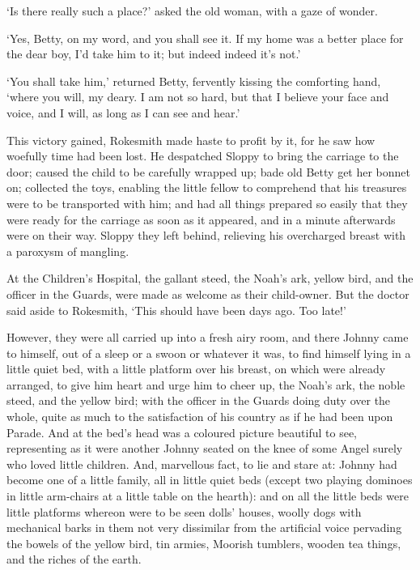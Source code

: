 ‘Is there really such a place?’ asked the old woman, with a gaze of
wonder.

‘Yes, Betty, on my word, and you shall see it. If my home was a better
place for the dear boy, I’d take him to it; but indeed indeed it’s not.’

‘You shall take him,’ returned Betty, fervently kissing the comforting
hand, ‘where you will, my deary. I am not so hard, but that I believe
your face and voice, and I will, as long as I can see and hear.’

This victory gained, Rokesmith made haste to profit by it, for he saw
how woefully time had been lost. He despatched Sloppy to bring the
carriage to the door; caused the child to be carefully wrapped up; bade
old Betty get her bonnet on; collected the toys, enabling the little
fellow to comprehend that his treasures were to be transported with
him; and had all things prepared so easily that they were ready for
the carriage as soon as it appeared, and in a minute afterwards were
on their way. Sloppy they left behind, relieving his overcharged breast
with a paroxysm of mangling.

At the Children’s Hospital, the gallant steed, the Noah’s ark, yellow
bird, and the officer in the Guards, were made as welcome as their
child-owner. But the doctor said aside to Rokesmith, ‘This should have
been days ago. Too late!’

However, they were all carried up into a fresh airy room, and there
Johnny came to himself, out of a sleep or a swoon or whatever it was,
to find himself lying in a little quiet bed, with a little platform over
his breast, on which were already arranged, to give him heart and urge
him to cheer up, the Noah’s ark, the noble steed, and the yellow bird;
with the officer in the Guards doing duty over the whole, quite as much
to the satisfaction of his country as if he had been upon Parade. And at
the bed’s head was a coloured picture beautiful to see, representing as
it were another Johnny seated on the knee of some Angel surely who loved
little children. And, marvellous fact, to lie and stare at: Johnny had
become one of a little family, all in little quiet beds (except two
playing dominoes in little arm-chairs at a little table on the hearth):
and on all the little beds were little platforms whereon were to be
seen dolls’ houses, woolly dogs with mechanical barks in them not very
dissimilar from the artificial voice pervading the bowels of the yellow
bird, tin armies, Moorish tumblers, wooden tea things, and the riches of
the earth.


